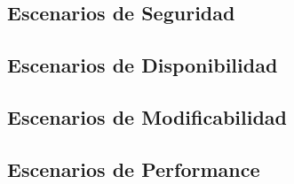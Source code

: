 \subsection{Escenarios de Seguridad}
\subsection{Escenarios de Disponibilidad}
\subsection{Escenarios de Modificabilidad}
\subsection{Escenarios de Performance}